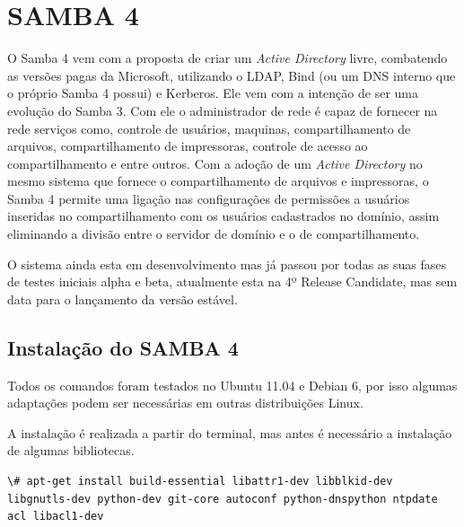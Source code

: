 \chapter{SAMBA 4}

O Samba 4 vem com a proposta de criar um \textit{Active Directory} livre, combatendo as versões pagas da Microsoft, utilizando o LDAP, Bind (ou um DNS interno que o próprio Samba 4 possui) e Kerberos. Ele vem com a intenção de ser uma evolução do Samba 3. Com ele o administrador de rede é capaz de fornecer na rede serviços como, controle de usuários, maquinas, compartilhamento de arquivos, compartilhamento de impressoras, controle de acesso ao compartilhamento e entre outros.
Com a adoção de um \textit{Active Directory} no mesmo sistema que fornece o compartilhamento de arquivos e impressoras, o Samba 4 permite uma ligação nas configurações de permissões a usuários inseridas no compartilhamento com os usuários cadastrados no domínio, assim eliminando a divisão entre o servidor de domínio e o de compartilhamento.

O sistema ainda esta em desenvolvimento mas já passou por todas as suas fases de testes iniciais alpha e beta, atualmente esta na 4º Release Candidate, mas sem data para o lançamento da versão estável.



\section{Instalação do SAMBA 4}

Todos os comandos foram testados no Ubuntu 11.04 e Debian 6, por isso algumas adaptações podem ser necessárias em outras distribuições Linux.

A instalação é realizada a partir do terminal, mas antes é necessário a instalação de algumas bibliotecas.

\begin{lstlisting}
\# apt-get install build-essential libattr1-dev libblkid-dev libgnutls-dev python-dev git-core autoconf python-dnspython ntpdate acl libacl1-dev
\end{lstlisting}

